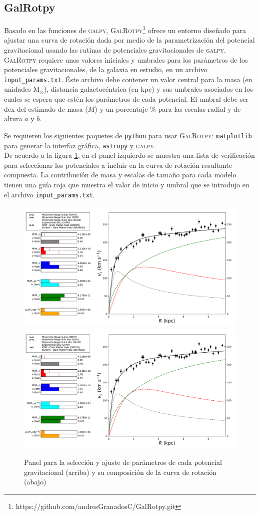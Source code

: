 \subsection{GalRotpy}

Basado en las funciones de \textsc{galpy}, \textsc{GalRotpy}\footnote{https://github.com/andresGranadosC/GalRotpy.git} ofrece un entorno diseñado para ajustar una curva de rotación dada por medio de la parametrización del potencial gravitacional usando las rutinas de potenciales gravitacionales de \textsc{galpy}.\\

\textsc{GalRotpy} requiere unos valores iniciales y umbrales para los parámetros de los potenciales gravitacionales, de la galaxia en estudio, en un archivo \verb+input_params.txt+. Éste archivo debe contener un valor central para la masa (en unidades  M$_\odot$), distancia galactocéntrica (en kpc) y sus umbrales asociados en los cuales se espera que estén los parámetros de cada potencial. El umbral debe ser dex del estimado de masa ($M$) y un porcentaje \% para las escalas radial y de altura $a$ y $b$.

Se requieren los siguientes paquetes de \verb+python+ para usar \textsc{GalRotpy}: \verb+matplotlib+ para generar la interfaz gráfica, \verb+astropy+ y \textsc{galpy}.\\


De acuerdo a la figura \ref{fig:GUI1}, en el panel izquierdo se muestra una lista de verificación para seleccionar los potenciales a incluir en la curva de rotación resultante compuesta. La contribución de masa y escalas de tamaño para cada modelo tienen una guía roja que muestra el valor de inicio y umbral que se introdujo en  el archivo \verb+input_params.txt+.

\begin{figure}
  \centering
    \includegraphics[trim=0cm 0cm 22cm 0cm,clip=true, width=0.4\columnwidth]{Kap2/curve_RotPy.pdf}
    \includegraphics[trim=10.5cm 0cm 0cm 0cm,clip=true, width=0.6\columnwidth]{Kap2/curve_RotPy.pdf}
  \caption{ Panel para la selección y ajuste de parámetros de cada potencial gravitacional (arriba) y su composición de la curva de rotación (abajo)}
  \label{fig:GUI1}
\end{figure}

